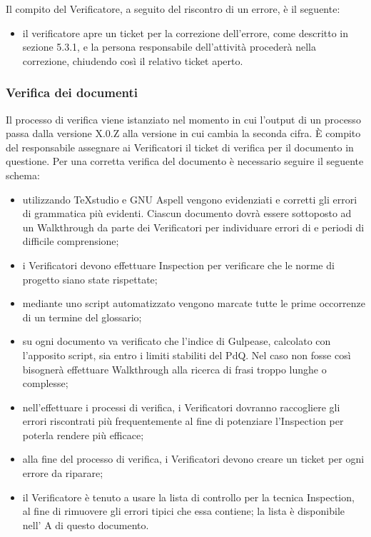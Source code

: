 Il compito del Verificatore, a seguito del riscontro di un errore, è il seguente:
\begin{itemize}
\item {} il verificatore apre un ticket per la correzione dell'errore, come descritto in sezione 5.3.1, e la persona responsabile dell'attività procederà nella correzione, chiudendo così il relativo ticket aperto.
\end{itemize}

\subsubsection{Verifica dei documenti}
\label{11.1}
Il processo di verifica viene istanziato nel momento in cui l'output di un processo passa
dalla versione X.0.Z alla versione in cui cambia la seconda cifra. È compito del responsabile assegnare ai Verificatori il ticket di verifica per il documento in questione.
Per una corretta verifica del documento è necessario seguire il seguente schema:
\begin{itemize}
\item {} utilizzando TeXstudio e GNU Aspell vengono evidenziati e corretti gli errori di grammatica più evidenti. Ciascun documento dovrà essere sottoposto ad un Walkthrough da parte dei Verificatori per individuare errori di  e periodi di difficile comprensione;
\item {} i Verificatori devono effettuare Inspection per verificare che le norme di progetto siano state rispettate;
\item {} mediante uno script automatizzato vengono marcate tutte le prime occorrenze di un termine del glossario;
\item {} su ogni documento va verificato che l'indice di Gulpease, calcolato con l'apposito script, sia entro i limiti stabiliti del PdQ. Nel caso non fosse così bisognerà effettuare Walkthrough alla ricerca di frasi troppo lunghe o complesse;
\item {} nell'effettuare i processi di verifica, i Verificatori dovranno raccogliere gli errori riscontrati più frequentemente al fine di potenziare l'Inspection per poterla rendere più efficace;
\item {} alla fine del processo di verifica, i Verificatori devono creare un ticket per ogni errore da riparare;
\item {} il Verificatore è tenuto a usare la lista di controllo per la tecnica Inspection, al fine di rimuovere gli errori tipici che essa contiene; la lista è disponibile nell' A di questo documento.
\end{itemize}

